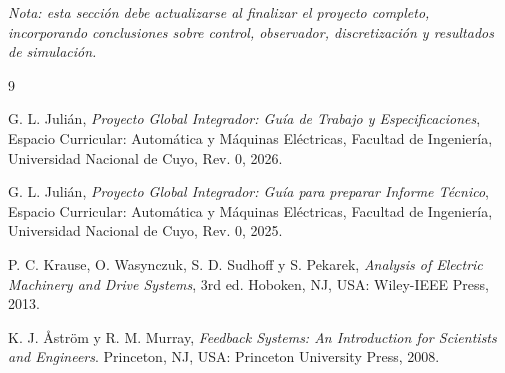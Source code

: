 \documentclass[10pt,a4paper]{article}
\begin{document}
\textit{Nota: esta sección debe actualizarse al finalizar el proyecto completo, incorporando conclusiones sobre control, observador, discretización y resultados de simulación.}

\begin{thebibliography}{9}

G. L. Julián, \textit{Proyecto Global Integrador: Guía de Trabajo y Especificaciones}, Espacio Curricular: Automática y Máquinas Eléctricas, Facultad de Ingeniería, Universidad Nacional de Cuyo, Rev. 0, 2026.

G. L. Julián, \textit{Proyecto Global Integrador: Guía para preparar Informe Técnico}, Espacio Curricular: Automática y Máquinas Eléctricas, Facultad de Ingeniería, Universidad Nacional de Cuyo, Rev. 0, 2025.

P. C. Krause, O. Wasynczuk, S. D. Sudhoff y S. Pekarek, \textit{Analysis of Electric Machinery and Drive Systems}, 3rd ed. Hoboken, NJ, USA: Wiley-IEEE Press, 2013.

K. J. Åström y R. M. Murray, \textit{Feedback Systems: An Introduction for Scientists and Engineers}. Princeton, NJ, USA: Princeton University Press, 2008.

\end{thebibliography}
\end{document}
